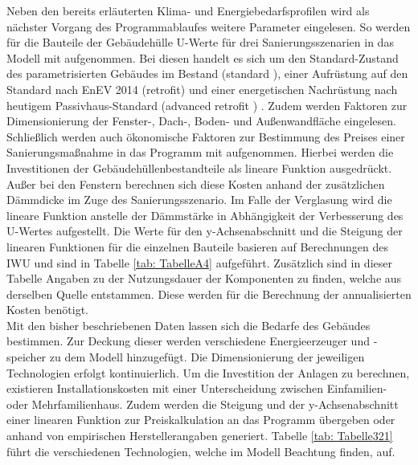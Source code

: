 Neben den bereits erläuterten Klima- und Energiebedarfsprofilen wird als nächster Vorgang des Programmablaufes weitere Parameter eingelesen.
So werden für die Bauteile der Gebäudehülle U-Werte für drei Sanierungsszenarien in das Modell mit aufgenommen.
Bei diesen handelt es sich um den Standard-Zustand des parametrisierten Gebäudes im Bestand (\glqq standard \grqq), einer Aufrüstung auf den Standard nach EnEV 2014 (\glqq retrofit\grqq) und einer energetischen Nachrüstung nach heutigem Passivhaus-Standard (\glqq advanced retrofit \grqq) \cite{.2015}.
Zudem werden Faktoren zur Dimensionierung der Fenster-, Dach-, Boden- und Außenwandfläche eingelesen.\\
Schließlich werden auch ökonomische Faktoren zur Bestimmung des Preises einer Sanierungsmaßnahme in das Programm mit aufgenommen. 
Hierbei werden die Investitionen der Gebäudehüllenbestandteile als lineare Funktion ausgedrückt.
Außer bei den Fenstern berechnen sich diese Kosten anhand der zusätzlichen Dämmdicke im Zuge des Sanierungsszenario.
Im Falle der Verglasung wird die lineare Funktion anstelle der Dämmstärke in Abhängigkeit der Verbesserung des U-Wertes aufgestellt.
Die Werte für den y-Achsenabschnitt und die Steigung der linearen Funktionen für die einzelnen Bauteile basieren auf Berechnungen des IWU \cite{Hinz.10.08.2015} und sind in Tabelle \ref{tab: TabelleA4} aufgeführt.
Zusätzlich sind in dieser Tabelle Angaben zu der Nutzungsdauer der Komponenten zu finden, welche aus derselben Quelle entstammen.
Diese werden für die Berechnung der annualisierten Kosten benötigt.\\
Mit den bisher beschriebenen Daten lassen sich die Bedarfe des Gebäudes bestimmen.
Zur Deckung dieser werden verschiedene Energieerzeuger und -speicher zu dem Modell hinzugefügt.
Die Dimensionierung der jeweiligen Technologien erfolgt kontinuierlich.
Um die Investition der Anlagen zu berechnen, existieren Installationskosten mit einer Unterscheidung zwischen Einfamilien- oder Mehrfamilienhaus.
Zudem werden die Steigung und der y-Achsenabschnitt einer linearen Funktion zur Preiskalkulation an das Programm übergeben oder anhand von empirischen Herstellerangaben generiert.
Tabelle \ref{tab: Tabelle321} führt die verschiedenen Technologien, welche im Modell Beachtung finden, auf.

